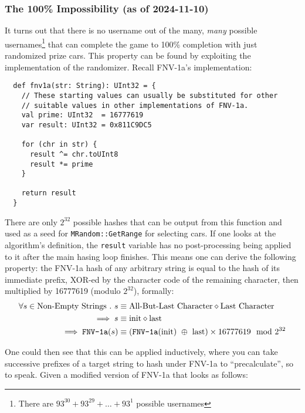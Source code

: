 \documentclass[14pt,a4paper,notitlepage]{extarticle}
\begin{document}
            \subsubsection*{The 100\% Impossibility (as of 2024-11-10)}
                It turns out that there is no username out of the many, \textit{many} possible
                usernames\footnote{There are $93^{30} + 93^{29} + \dots + 93^1$ possible usernames}
                that can complete the game to 100\% completion with just randomized prize
                cars. This property can be found by exploiting the implementation of the randomizer.
                Recall FNV-1a's implementation:

                \begin{lstlisting}
  def fnv1a(str: String): UInt32 = {
    // These starting values can usually be substituted for other
    // suitable values in other implementations of FNV-1a.
    val prime: UInt32  = 16777619
    var result: UInt32 = 0x811C9DC5

    for (chr in str) {
      result ^= chr.toUInt8
      result *= prime
    }

    return result
  }
                \end{lstlisting}

                There are only $2^{32}$ possible hashes that can be output from this function and
                used as a seed for \texttt{MRandom::GetRange} for selecting cars. If one
                looks at the algorithm's definition, the \texttt{result} variable has no
                post-processing being applied to it after the main hasing loop finishes.
                This means one can derive the following property: the FNV-1a hash of any arbitrary
                string is equal to the hash of its immediate prefix, XOR-ed by the character code
                of the remaining character, then multiplied by 16777619 (modulo $2^{32}$), formally:
                \begin{align*}
                    \forall s \in \text{Non-Empty Strings}\ .\ s &\equiv \text{All-But-Last Character} \diamond \text{Last Character}\\
                    \implies s &\equiv \text{init} \diamond \text{last}\\
                    \implies \text{\texttt{FNV-1a}}(s) &\equiv (\text{\texttt{FNV-1a}}(\text{init})\ \oplus\ \text{last}) \times 16777619 \mod 2^{32}
                \end{align*}

                One could then see that this can be applied inductively, where you can take successive
                prefixes of a target string to hash under FNV-1a to ``precalculate'', so to speak.
                Given a modified version of FNV-1a that looks as follows:
\end{document}
